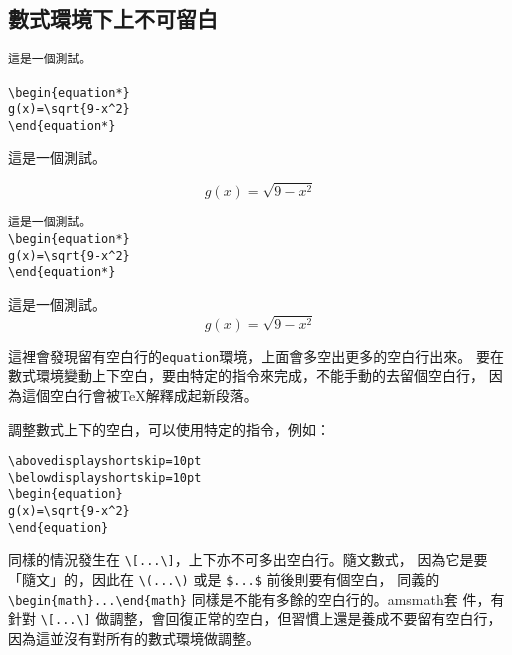 \subsection{數式環境下上不可留白}

\begin{Wrong}
\begin{verbatim}
這是一個測試。

\begin{equation*}
g(x)=\sqrt{9-x^2}
\end{equation*}
\end{verbatim}
這是一個測試。

\begin{equation*}
g(x)=\sqrt{9-x^2}
\end{equation*}
\end{Wrong}

\begin{Right}
\begin{verbatim}
這是一個測試。
\begin{equation*}
g(x)=\sqrt{9-x^2}
\end{equation*}
\end{verbatim}
這是一個測試。
\begin{equation*}
g(x)=\sqrt{9-x^2}
\end{equation*}
\end{Right}

這裡會發現留有空白行的{\tt equation}環境，上面會多空出更多的空白行出來。
要在數式環境變動上下空白，要由特定的指令來完成，不能手動的去留個空白行，
因為這個空白行會被\TeX 解釋成起新段落。

調整數式上下的空白，可以使用特定的指令，例如：

\begin{Code}
\begin{verbatim}
\abovedisplayshortskip=10pt
\belowdisplayshortskip=10pt
\begin{equation}
g(x)=\sqrt{9-x^2}
\end{equation}
\end{verbatim}
\end{Code}

同樣的情況發生在 \verb|\[...\]|，上下亦不可多出空白行。隨文數式，
因為它是要「隨文」的，因此在 \verb|\(...\)| 或是 \verb|$...$| 前後則要有個空白，
同義的 \verb|\begin{math}...\end{math}| 同樣是不能有多餘的空白行的。{\sf amsmath}套
件，有針對 \verb|\[...\]| 做調整，會回復正常的空白，但習慣上還是養成不要留有空白行，
因為這並沒有對所有的數式環境做調整。

\marginpar{\back}

